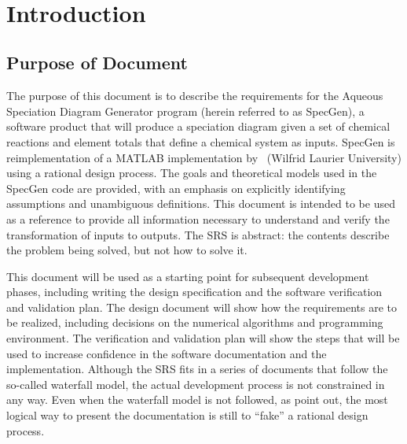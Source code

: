 \documentclass[12pt]{article}
\newcommand{\progname}{SpecGen} %
\begin{document}
\newpage

\tableofcontents

~\newpage


\setcounter{secnumdepth}{3}

\section{Introduction}

\subsection{Purpose of Document}
The purpose of this document is to describe the requirements for the Aqueous 
Speciation Diagram Generator program (herein referred to as \progname), a 
software product that will produce a speciation diagram given a set of chemical 
reactions and element totals that define a chemical system as inputs.  \progname{}
is reimplementation of a MATLAB implementation by~\cite{smith2007} 
(Wilfrid Laurier University) using a rational design process.  The goals 
and theoretical models used in the SpecGen code are provided, with an emphasis 
on explicitly identifying assumptions and unambiguous definitions. This document 
is intended to be used as a reference to provide all information necessary to 
understand and verify the transformation of inputs to outputs. The SRS is 
abstract: the contents describe the problem being solved, but not how to solve 
it.

This document will be used as a starting point for subsequent development
phases, including writing the design specification and the software verification
and validation plan. The design document will show how the requirements are to
be realized, including decisions on the numerical algorithms and programming
environment. The verification and validation plan will show the steps that will
be used to increase confidence in the software documentation and the
implementation. Although the SRS fits in a series of documents that follow the
so-called waterfall model, the actual development process is not constrained in
any way. Even when the waterfall model is not followed, as
\cite{ParnasAndClements1986} point out, the most logical way to present the
documentation is still to ``fake''  a rational design process.

\end{document}
